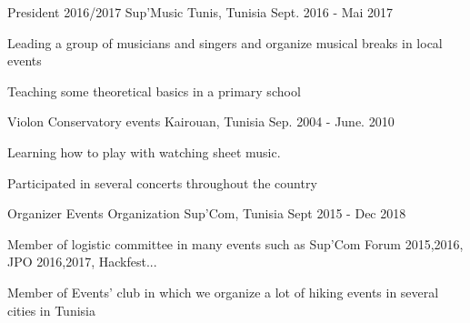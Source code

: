 

\begin{cventries}

  \cventry
    {President 2016/2017} %
    {Sup'Music} %
    {Tunis, Tunisia } %
    {Sept. 2016 - Mai 2017} %
    {
      \begin{cvitems} %
        \item {Leading a group of musicians and singers and organize musical breaks in local events}
        \item {Teaching some theoretical basics in a primary school }
      \end{cvitems}
    }

  \cventry
    {Violon} %
    {Conservatory events} %
    {Kairouan, Tunisia} %
    {Sep. 2004 - June. 2010} %
    {
      \begin{cvitems} %
        \item {Learning how to play with watching sheet music.}
        \item {Participated in several concerts throughout the country}
      \end{cvitems}
    }

 \cventry
    {Organizer} %
    {Events Organization} %
    {Sup'Com, Tunisia} %
    {Sept 2015 - Dec 2018} %
    {
      \begin{cvitems} %
        \item {Member of logistic committee in many events such as Sup'Com Forum 2015,2016, JPO 2016,2017, Hackfest... }
        \item {Member of Events' club in which we organize a lot of hiking events in several cities in Tunisia}
      \end{cvitems}
    }


\end{cventries}
